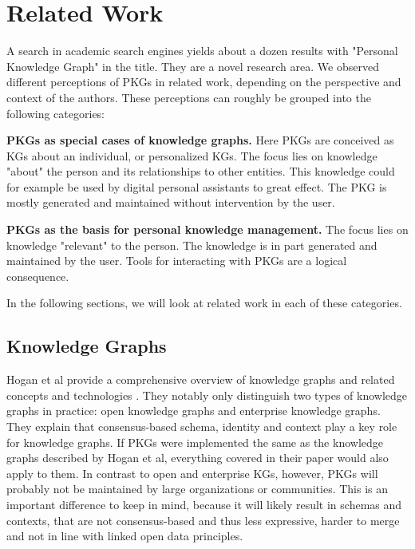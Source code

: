\chapter{Related Work} \label{ch:relatedwork}

A search in academic search engines yields about a dozen results with "Personal Knowledge Graph" in the title. They are a novel research area. We observed different perceptions of PKGs in related work, depending on the perspective and context of the authors. These perceptions can roughly be grouped into the following categories:

\textbf{PKGs as special cases of knowledge graphs.} Here PKGs are conceived as KGs about an individual, or personalized KGs. The focus lies on knowledge "about" the person and its relationships to other entities. This knowledge could for example be used by digital personal assistants to great effect. The PKG is mostly generated and maintained without intervention by the user.

\textbf{PKGs as the basis for personal knowledge management.} The focus lies on knowledge "relevant" to the person. The knowledge is in part generated and maintained by the user. Tools for interacting with PKGs are a logical consequence.

In the following sections, we will look at related work in each of these categories.

\section{Knowledge Graphs}

Hogan et al provide a comprehensive overview of knowledge graphs and related concepts and technologies \cite{Hogan2021KG}. They notably only distinguish two types of knowledge graphs in practice: open knowledge graphs and enterprise knowledge graphs. They explain that consensus-based schema, identity and context play a key role for knowledge graphs. If PKGs were implemented the same as the knowledge graphs described by Hogan et al, everything covered in their paper would also apply to them. In contrast to open and enterprise KGs, however, PKGs will probably not be maintained by large organizations or communities. This is an important difference to keep in mind, because it will likely result in schemas and contexts, that are not consensus-based and thus less expressive, harder to merge and not in line with linked open data principles.

